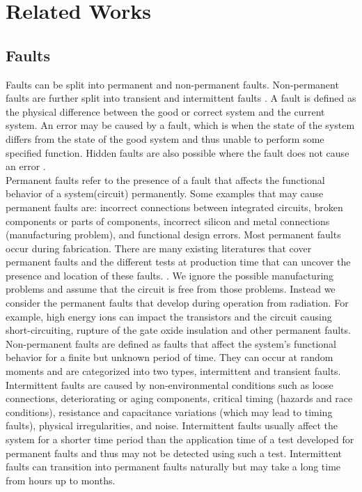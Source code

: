 \documentclass[12pt]{report}
\begin{document}
\chapter{Related Works}
\section{Faults}
Faults can be split into permanent and non-permanent faults. Non-permanent faults are further split into transient and intermittent faults \cite{jha_gupta_2003}. %
A fault is defined as the physical difference between the good or correct system and the current system. An error may be caused by a fault, which is when the state of the system differs from the state of the good system and thus unable to perform some specified function. Hidden faults are also possible where the fault does not cause an error \cite{jha_gupta_2003}. \\

Permanent faults refer to the presence of a fault that affects the functional behavior of a system(circuit) permanently. Some examples that may cause permanent faults are: incorrect connections between integrated circuits, broken components or parts of components, incorrect silicon and metal connections (manufacturing problem), and functional design errors. Most permanent faults occur during fabrication. There are many existing literatures that cover permanent faults and the different tests at production time that can uncover the presence and location of these faults. \cite{jha_gupta_2003} \cite{giz_book_2006}. We ignore the possible manufacturing problems and assume that the circuit is free from those problems. Instead we consider the permanent faults that develop during operation from radiation. For example, high energy ions can impact the transistors and the circuit causing short-circuiting, rupture of the gate oxide insulation and other permanent faults.\\ %

Non-permanent faults are defined as faults that affect the system's functional behavior for a finite but unknown period of time. They can occur at random moments and are categorized into two types, intermittent and transient faults. Intermittent faults are caused by non-environmental conditions such as loose connections, deteriorating or aging components, critical timing (hazards and race conditions), resistance and capacitance variations (which may lead to timing faults), physical irregularities, and noise. Intermittent faults usually affect the system for a shorter time period than the application time of a test developed for permanent faults and thus may not be detected using such a test. Intermittent faults can transition into permanent faults naturally but may take a long time from hours up to months. \\
\end{document}
